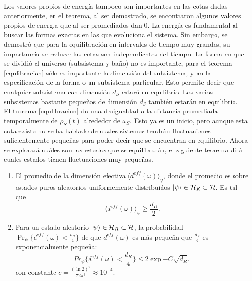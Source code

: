 \\
Los valores propios de energía tampoco son importantes en las cotas dadas anteriormente, en el teorema, al ser demostrado, se encontraron algunos valores propios de energía que al ser promediados dan 0. La energía es fundamental al buscar las formas exactas en las que evoluciona el sistema. Sin embargo, se demostró que para la equilibración en intervalos de tiempo muy grandes, su importancia se reduce: las cotas son independientes del tiempo. La forma en que se dividió el universo (subsistema y baño) no es importante, para el teorema \ref{equlibracion} sólo es importante la dimensión del subsistema, y no la especificación de la forma o un subsistema particular. Esto permite decir que cualquier subsistema con dimensión $d_{S}$ estará en equilibrio. Los varios subsistemas bastante pequeños de dimensión $d_{S}$ también estarán en equilibrio.
\\
El teorema \ref{equlibracion} da una desigualdad a la distancia promediada temporalmente de $\rho_{S}(t)$ alrededor de $\omega_{S}$. Esto ya es un inicio, pero aunque esta cota exista no se ha hablado de cuales sistemas tendrán fluctuaciones suficientemente pequeñas para poder decir que se encuentran en equilibrio. Ahora se explorará cuáles son los estados que se equilibrarán; el siguiente teorema dirá cuales estados tienen fluctuaciones muy pequeñas.

\begin{theorem}\label{teorema2}

\begin{enumerate}

\item El promedio de la dimensión efectiva $\langle d^{eff}(\omega) \rangle_{\psi}$, donde el promedio es sobre estados puros aleatorios uniformemente distribuidos $\ket{\psi} \in \mathcal{H}_{R} \subset \mathcal{H}$. Es tal que
\begin{equation}
\langle d^{eff}(\omega) \rangle_{\psi} \ge \frac{d_{R}}{2}.
\end{equation}
\item Para un estado aleatorio $\ket{\psi} \in \mathcal{H}_{R} \subset \mathcal{H}$, la probabilidad $\Pr_{\psi} \{ d^{eff}(\omega) < \frac{d_{R}}{4}  \}$ de que $d^{eff}(\omega)$ es más pequeña que $\frac{d_{R}}{4}$ es exponencialmente pequeña:
\begin{equation}
Pr_{\psi} \{ d^{eff}(\omega) < \frac{d_{R}}{4}  \} \leq 2 \exp{-C \sqrt{d_{R}}},
\end{equation}
con constante $c= \frac{(\ln 2)^{2}}{72 \pi^{3}} \approx 10^{-4}$.
\end{enumerate}
\end{theorem}

